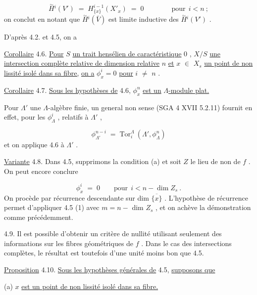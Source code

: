\begin{equation*}
\overset{\sim}{H}{}^{i}(V') \;=\; H^{i-1}_{\{x\}}(X'_x) \;=\; 0 \qquad\qquad \text{pour}\ \ i < n\ ;
\end{equation*}
on conclut en notant que  $\overset{\sim}{H}{}^{i}(\bar{V})$  est limite inductive des  $\overset{\sim}{H}{}^{i}(V')$  .

D'après 4.2. et 4.5, on a

\underline{Corollaire} 4.6.  \underline{Pour}  $S$  \underline{un trait hensélien de caractéristique} 0 ,  $X/S$  \underline{une intersection complète relative de dimension relative}  $n$  \underline{et}  $x$ $\in$ $X_s$  \underline{un point de non lissité isolé dans sa fibre,} \underline{on a}  $\phi^i_x = 0$  \underline{pour}  $i$ $\neq$ $n$ .

\underline{Corollaire} 4.7.  \underline{Sous les hypothèses de} 4.6,  $\phi^n_x$  \underline{est un}  \underline{$\Lambda$-module plat.}

Pour  $\Lambda'$  une $\Lambda$-algèbre finie, un general non sense (SGA 4 XVII 5.2.11) fournit en effet, pour les  $\phi^i_{\Lambda}$ , relatifs à  $\Lambda'$ ,



\begin{equation*}
\phi^{n-i}_{\Lambda'} \;=\; \mathrm{Tor}^{\Lambda}_{i}\ (\Lambda',\phi^n_{\Lambda})
\end{equation*}
et on applique 4.6 à  $\Lambda'$  .

\underline{Variante} 4.8.  Dans 4.5, supprimons la condition (a) et soit  $Z$  le lieu de non de  $f$ . On peut encore conclure

\begin{equation*}
\phi^i_x \;=\; 0 \qquad \text{pour}\ \ i < n - \dim Z_s\ .
\end{equation*}
On procède par récurrence descendante sur  dim $\overline{\{x\}}$ . L'hypothèse de récurrence permet d'appliquer 4.5 (1) avec  $m = n -$ dim $Z_s$ , et on achève la démonstration comme précédemment.

4.9.  Il est possible d'obtenir un critère de nullité utilisant seulement des informations sur les fibres géométriques de  $f$ . Dans le cas des intersections complètes, le résultat est toutefois d'une unité moins bon que 4.5.

\underline{Proposition} 4.10.  \underline{Sous les hypothèses générales de} 4.5, \underline{supposons que}

(a)  $x$  \underline{est un point de non lissité isolé dans sa fibre.}

